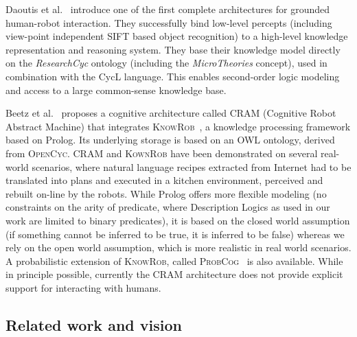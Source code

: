 \documentclass{svmult}
\begin{document}
Daoutis et al.~\cite{Daoutis2009} introduce one of the first complete
architectures for grounded human-robot interaction. They successfully bind
low-level percepts (including view-point independent SIFT based object
recognition) to a high-level knowledge representation and reasoning system.
They base their knowledge model directly on the \textit{ResearchCyc} ontology
(including the \textit{MicroTheories} concept), used in combination with the
{\sc CycL} language. This enables second-order logic modeling and access to a
large common-sense knowledge base.

Beetz et al.~\cite{Beetz2010} proposes a cognitive architecture called
\textsc{CRAM} (Cognitive Robot Abstract Machine) that integrates
\textsc{KnowRob}~\cite{Tenorth2009a}, a knowledge processing framework based on
Prolog. Its underlying storage is based on an OWL ontology, derived from
\textsc{OpenCyc}. \textsc{CRAM} and \textsc{KownRob} have been demonstrated on
several real-world scenarios, where natural language recipes extracted from
Internet had to be translated into plans and executed in a kitchen environment,
perceived and rebuilt on-line by the robots. While Prolog offers more flexible
modeling (no constraints on the arity of predicate, where Description Logics as
used in our work are limited to binary predicates), it is based on the closed
world assumption (if something cannot be inferred to be true, it is inferred to
be false) whereas we rely on the open world assumption, which is more realistic
in real world scenarios. A probabilistic extension of \textsc{KnowRob}, called
\textsc{ProbCog}~\cite{Jain2009} is also available. While in principle
possible, currently the CRAM architecture does not provide explicit support for
interacting with humans.

\subsection{Related work and vision}\label{sec:soa}

\end{document}

